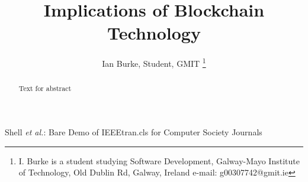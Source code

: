 \documentclass[report]{IEEEtran}
\begin{document}
\title{Implications of Blockchain Technology}
\author{Ian Burke, Student, GMIT %
\thanks{I. Burke is a student studying
Software Development, Galway-Mayo Institute of Technology, Old Dublin Rd, Galway, Ireland e-mail: g00307742@gmit.ie}%
}

\maketitle

\begin{abstract}
Text for abstract
\end{abstract}

%
{Shell \MakeLowercase{\textit{et al.}}: Bare Demo of IEEEtran.cls for Computer Society Journals}
\end{document}

